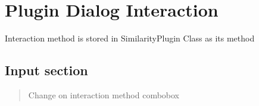\documentclass[letterpaper,10pt,english]{sphinxmanual}
\begin{document}
\chapter{Plugin Dialog Interaction}
\label{\detokenize{dialog_interaction:plugin-dialog-interaction}}\label{\detokenize{dialog_interaction::doc}}
Interaction method is stored in SimilarityPlugin Class as its method


\section{Input section}
\label{\detokenize{dialog_interaction:input-section}}\begin{quote}

\begin{fulllineitems}
\label{\detokenize{dialog_interaction:methodChange}}
Change on interaction method combobox

\end{fulllineitems}

\end{quote}
\end{document}
